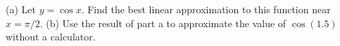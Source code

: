 (a) Let $y=\cos x$. Find the best
linear approximation to this function near $x=\pi/2$.\answercheck\hwendpart
(b) Use the result of part a to approximate the value of $\cos(1.5)$ without a calculator.\answercheck\hwendpart
